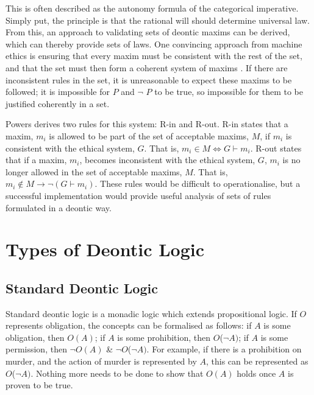 \documentclass{l4proj}
\begin{document}
This is often described as the autonomy formula of the categorical imperative. Simply put, the principle is that the rational will should determine universal law. From this, an approach to validating sets of deontic maxims can be derived, which can thereby provide sets of laws. One convincing approach from machine ethics is ensuring that every maxim must be consistent with the rest of the set, and that the set must then form a coherent system of maxims \cite{Powers}. If there are inconsistent rules in the set, it is unreasonable to expect these maxims to be followed; it is impossible for $P$ and \( \neg \) $P$ to be true, so impossible for them to be justified coherently in a set. 

Powers derives two rules for this system: R-in and R-out. R-in states that a maxim, $m_i$ is allowed to be part of the set of acceptable maxims, $M$, if $m_i$ is consistent with the ethical system, $G$. That is, $m_i \in M \iff G \vdash m_i $. R-out states that if a maxim, $m_i$, becomes inconsistent with the ethical system, $G$, $m_i$ is no longer allowed in the set of acceptable maxims, $M$. That is, $m_i \notin M \rightarrow \neg(G \vdash m_i)$. These rules would be difficult to operationalise, but a successful implementation would provide useful analysis of sets of rules formulated in a deontic way. 


\section{Types of Deontic Logic}

\subsection{Standard Deontic Logic}
Standard deontic logic is a monadic logic which extends propositional logic. If $O$ represents obligation, the concepts can be formalised as follows: if $A$ is some obligation, then $O(A)$; if $A$ is some prohibition, then $O$(\( \neg \)$A)$; if $A$ is some permission, then \( \neg \)$O(A)$ \& \( \neg \)$O$(\( \neg \)$A)$. For example, if there is a prohibition on murder, and the action of murder is represented by $A$, this can be represented as $O$(\( \neg \)$A)$. Nothing more needs to be done to show that $O(A)$ holds once $A$ is proven to be true. 
\end{document}
